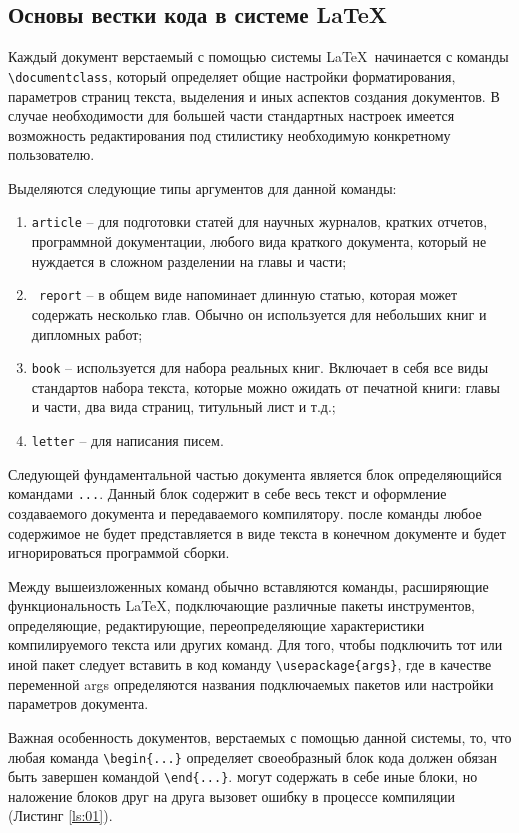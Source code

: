 \subsection{Основы вестки кода в системе \LaTeX}
    Каждый документ верстаемый с помощью системы \LaTeX\verb| |начинается с команды \verb|\documentclаss|, который определяет общие настройки форматирования, параметров страниц текста, выделения и иных аспектов создания документов. В случае необходимости для большей части стандартных настроек имеется возможность редактирования под стилистику необходимую конкретному пользователю.

    Выделяются следующие типы аргументов для данной команды:

    \begin{enumerate}
        \item  \verb|article| -- для подготовки статей для научных журналов, кратких отчетов, программной документации, любого вида краткого документа, который не нуждается в сложном разделении на главы и части;
        \item \verb| report| -- в общем виде напоминает длинную статью, которая может содержать несколько глав. Обычно он используется для небольших книг и дипломных работ;
        \item  \verb|book| -- используется для набора реальных книг. Включает в себя все виды стандартов набора текста, которые можно ожидать от печатной книги: главы и части, два вида страниц, титульный лист и т.д.;
        \item  \verb|letter| -- для написания писем.
    \end{enumerate}

    Следующей фундаментальной частью документа является блок определяющийся командами \verb|...|. Данный блок содержит в себе весь текст и оформление создаваемого документа и передаваемого компилятору. после команды \verb|| любое содержимое не будет представляется в виде текста в конечном документе и будет игнорироваться программой сборки. 

    Между вышеизложенных команд обычно вставляются команды, расширяющие функциональность \LaTeX, подключающие различные пакеты инструментов, определяющие, редактирующие, переопределяющие характеристики компилируемого текста или других команд. Для того, чтобы подключить тот или иной пакет следует вставить в код команду \verb|\usepackage{args}|, где в качестве переменной args определяются названия подключаемых пакетов или настройки параметров документа.

    Важная особенность документов, верстаемых с помощью данной системы, то, что любая команда \verb|\begin{...}| определяет своеобразный блок кода должен обязан быть завершен командой \verb|\end{...}|. \guillemotright  могут содержать в себе иные блоки, но наложение блоков друг на друга вызовет ошибку в процессе компиляции (Листинг \ref{ls:01}).

